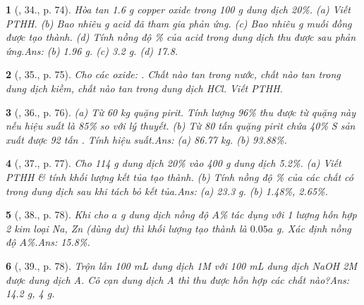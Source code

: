 \documentclass{article}
\newtheorem{baitoan}{}
\begin{document}
\begin{baitoan}[\cite{An_Hoa_Hoc_nang_cao_8_9}, 34., p. 74]
	Hòa tan {\rm1.6 g} copper oxide trong {\rm100 g} dung dịch {\rm{} 20\%}. (a) Viết {\rm PTHH}. (b) Bao nhiêu {\rm g} acid đã tham gia phản ứng. (c) Bao nhiêu {\rm g} muối đồng được tạo thành. (d) Tính nồng độ {\rm\%} của acid trong dung dịch thu được sau phản ứng.\hfill{\sf Ans: (b) 1.96 g. (c) 3.2 g. (d) 17.8.}
\end{baitoan}

\begin{baitoan}[\cite{An_Hoa_Hoc_nang_cao_8_9}, 35., p. 75]
	Cho các oxide: {\rm{}}. Chất nào tan trong nước, chất nào tan trong dung dịch kiềm, chất nào tan trong dung dịch {\rm HCl}. Viết {\rm PTHH}.
\end{baitoan}

\begin{baitoan}[\cite{An_Hoa_Hoc_nang_cao_8_9}, 36., p. 76]
	(a) Từ {\rm60 kg} quặng pirit. Tính lượng {\rm{} 96\%} thu được từ quặng này nếu hiệu suất là {\rm85\%} so với lý thuyết. (b) Từ {\rm80} tấn quặng pirit chứa {\rm40\% S} sản xuất được {\rm92} tấn {\rm{}}. Tính hiệu suất.\hfill{\sf Ans: (a) 86.77 kg. (b) 93.88\%.}
\end{baitoan}

\begin{baitoan}[\cite{An_Hoa_Hoc_nang_cao_8_9}, 37., p. 77]
	Cho {\rm114 g} dung dịch {\rm{} 20\%} vào {\rm400 g} dung dịch {\rm{} 5.2\%}. (a) Viết {\rm PTHH} \& tính khối lượng kết tủa tạo thành. (b) Tính nồng độ {\rm\%} của các chất có trong dung dịch sau khi tách bỏ kết tủa.\hfill{\sf Ans: (a) 23.3 g. (b) 1.48\%, 2.65\%.}
\end{baitoan}

\begin{baitoan}[\cite{An_Hoa_Hoc_nang_cao_8_9}, 38., p. 78]
	Khi cho $a$ {\rm g} dung dịch {\rm {}} nồng độ $A${\rm\%} tác dụng với 1 lượng hỗn hợp 2 kim loại {\rm Na, Zn} (dùng dư) thì khối lượng {\rm {}} tạo thành là $0.05a$ {\rm g}. Xác định nồng độ $A${\rm\%}.\hfill{\sf Ans: 15.8\%.}
\end{baitoan}

\begin{baitoan}[\cite{An_Hoa_Hoc_nang_cao_8_9}, 39., p. 78]
	Trộn lẫn {\rm100 mL} dung dịch {\rm{} 1M} với {\rm100 mL} dung dịch {\rm NaOH 2M} được dung dịch A. Cô cạn dung dịch A thì thu được hỗn hợp các chất nào?\hfill{\sf Ans: 14.2 g, 4 g.}
\end{baitoan}
\end{document}
